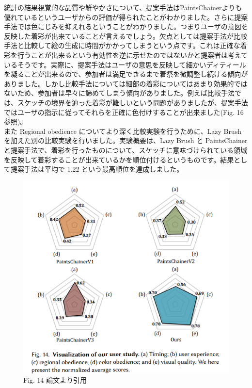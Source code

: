 \documentclass[a4paper, dvipdfmx, 10pt]{article}
\begin{document}
統計の結果視覚的な品質や鮮やかさについて、提案手法はPaintsChainerよりも優れているというユーザからの評価が得られたことがわかりました。さらに提案手法では色にじみを抑えれるということがわかりました。つまりユーザの意図を反映した着彩が出来ていることが言えるでしょう。欠点としては提案手法が比較手法と比較して絵の生成に時間がかかってしまうという点です。これは正確な着彩を行うことが出来るという有効性を逆に示せたのではないかと提案者は考えているそうです。実際に、提案手法はユーザの意思を反映して細かいディティールを凝ることが出来るので、参加者は満足できるまで着祭を微調整し続ける傾向がありました。しかし比較手法については細部の着彩についてはあまり効果的ではないため、参加者は早々に諦めてしまう傾向がありました。例えば比較手法では、スケッチの境界を辿った着彩が難しいという問題がありましたが、提案手法ではユーザの指示に従ってそれらを正確に色付けすることが出来ました(Fig. 16 参照)。\\

また Regional obedience についてより深く比較実験を行うために、Lazy Brush を加えた別の比較実験を行いました。実験概要は、Lazy Brush と PaintsChainer と提案手法で、着彩を行ったものについて、スケッチに意味づけられている領域を反映して着彩することが出来ているかを順位付けるというものです。結果として提案手法は平均で 1.22 という最高順位を達成しました。\\

\begin{figure}[htbp]
\centering
\includegraphics[width=.9\linewidth]{./img/s2p_fig14.PNG}
\caption{Fig. 14 論文より引用}
\end{figure}
\end{document}
